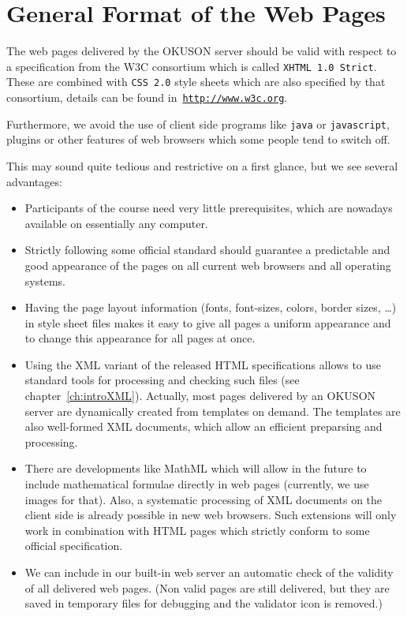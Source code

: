 \documentclass[12pt,openany,a4paper]{book}
\newcommand{\OKUSON}{\textsf{OKUSON}}
\begin{document}
\section{General Format of the Web Pages}

The web pages delivered by the {\OKUSON} server should be valid with
respect to a specification from the W3C consortium which is called
\texttt{XHTML 1.0 Strict}. These are combined with \texttt{CSS 2.0}
style sheets which are also specified by that consortium, details can be
found in~\href{http://www.w3c.org}{\texttt{http://www.w3c.org}}.

Furthermore, we avoid the use of client side programs like \texttt{java} or
\texttt{javascript}, plugins or other features of web browsers which 
some people tend to switch off. 

This may sound quite tedious and restrictive on a first glance, but we see
several advantages:
\begin{itemize}
\item Participants of the course need very little prerequisites, which are
nowadays available on essentially any computer. 
\item Strictly following some official standard should guarantee a
predictable and good appearance of the pages on all current web browsers
and all operating systems.
\item Having the page layout information (fonts, font-sizes, colors, border
sizes, \ldots) in style sheet files makes it easy to give all pages a
uniform appearance and to change this appearance for all pages at once.
\item Using the XML variant of the released HTML specifications allows to use 
standard tools for processing and checking such files (see
chapter~\ref{ch:introXML}).  Actually, most pages delivered by an {\OKUSON}
server are dynamically created from templates on demand. The templates are
also well-formed XML documents, which allow an efficient preparsing and
processing.
\item There are  developments like MathML which will allow in the future to
include mathematical formulae directly in web pages (currently, we use
images for that). Also, a systematic processing of XML documents on the client 
side is already possible in new web browsers. Such extensions will only work 
in combination with HTML pages which strictly conform to some official
specification.
\item We can include in our built-in web server an automatic check of the
validity of all delivered web pages. (Non valid pages are still delivered,
but they are saved in temporary files for debugging and the validator 
icon is removed.)
\end{itemize}
\end{document}
